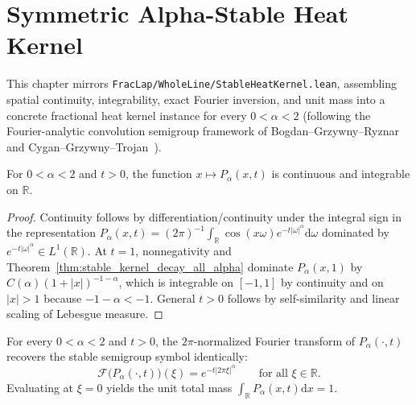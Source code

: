 \chapter{Symmetric Alpha-Stable Heat Kernel}

This chapter mirrors \texttt{FracLap/WholeLine/StableHeatKernel.lean}, assembling spatial continuity, integrability, exact Fourier inversion, and unit mass into a concrete fractional heat kernel instance for every $0 < \alpha < 2$ (following the Fourier-analytic convolution semigroup framework of Bogdan--Grzywny--Ryznar~\cite{bogdan_2014_density_tails_unimodal_semigroups} and Cygan--Grzywny--Trojan~\cite{cygan_2015_asymptotic_densities_unimodal_semigroups}).

\begin{lemma}\label{lem:stable_kernel_continuous_integrable}
\leanok
For $0 < \alpha < 2$ and $t > 0$, the function $x \mapsto P_\alpha(x, t)$ is continuous and integrable on $\mathbb{R}$.
\end{lemma}

\begin{proof}
\leanok
Continuity follows by differentiation/continuity under the integral sign in the representation $P_\alpha(x, t) = (2\pi)^{-1} \int_{\mathbb{R}} \cos(x \omega) e^{-t \lvert \omega \rvert^\alpha} \mathrm{d}\omega$ dominated by $e^{-t \lvert \omega \rvert^\alpha} \in L^1(\mathbb{R})$. At $t = 1$, nonnegativity and Theorem~\ref{thm:stable_kernel_decay_all_alpha} dominate $P_\alpha(x, 1)$ by $C(\alpha)(1 + \lvert x \rvert)^{-1-\alpha}$, which is integrable on $[-1, 1]$ by continuity and on $\lvert x \rvert > 1$ because $-1 - \alpha < -1$. General $t > 0$ follows by self-similarity and linear scaling of Lebesgue measure.
\end{proof}

\begin{theorem}\label{thm:stable_kernel_fourier_faithfulness}
\leanok
For every $0 < \alpha < 2$ and $t > 0$, the $2\pi$-normalized Fourier transform of $P_\alpha(\cdot, t)$ recovers the stable semigroup symbol identically:
\[
  \mathcal{F}\bigl(P_\alpha(\cdot, t)\bigr)(\xi) = e^{-t \lvert 2\pi \xi \rvert^\alpha} \qquad \text{for all } \xi \in \mathbb{R}.
\]
Evaluating at $\xi = 0$ yields the unit total mass $\int_{\mathbb{R}} P_\alpha(x, t) \mathrm{d}x = 1$.
\end{theorem}

